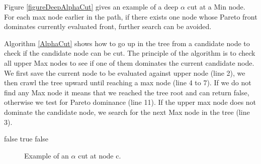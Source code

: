 \documentclass[letterpaper]{article} %
\newcommand{\tcomment}[1]{\textcolor{red}{Tristan: #1}}
\begin{document}
Figure \ref{figureDeepAlphaCut} gives an example of a deep $\alpha$ cut at a Min node. For each max node earlier in the path, if there exists one node whose Pareto front dominates currently evaluated front, further search can be avoided.

Algorithm \ref{AlphaCut} shows how to go up in the tree from a candidate node to check if the candidate node can be cut. The principle of the algorithm is to check all upper Max nodes to see if one of them dominates the current candidate node. We first save the current node to be evaluated against upper node (line 2), we then crawl the tree upward until reaching a max node (line 4 to 7). If we do not find any Max node it means that we reached the tree root and can return false, otherwise we test for Pareto dominance (line 11). If the upper max node does not dominate the candidate node, we search for the next Max node in the tree (line 3).



\begin{algorithm}
\begin{algorithmic}[1]
\begin{ALC@g}
\ENDWHILE
{}
\RETURN false
\ENDIF
{}
\RETURN true
\ENDIF
\ENDWHILE
\RETURN false
\end{ALC@g}
\end{algorithmic}
\caption{\label{AlphaCut}The deep $\alpha$ cut}
\end{algorithm}

\begin{figure}
  \centering
  \caption{Example of an $\alpha$ cut at node c.}
  \label{figureAlphaCut}
\end{figure}
\end{document}

